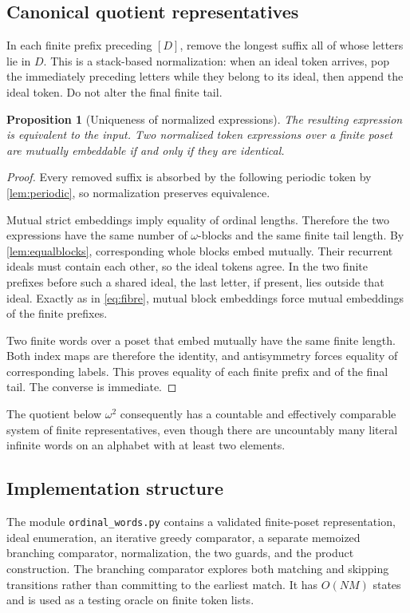 \documentclass[11pt]{article}
\numberwithin{equation}{section}
\theoremstyle{plain}
\newtheorem{proposition}[proposition]{Proposition}
\theoremstyle{definition}
\theoremstyle{remark}
\begin{document}
\subsection{Canonical quotient representatives}

In each finite prefix preceding $[D]$, remove the longest suffix all of whose letters lie in $D$. This is a stack-based normalization: when an ideal token arrives, pop the immediately preceding letters while they belong to its ideal, then append the ideal token. Do not alter the final finite tail.

\begin{proposition}[Uniqueness of normalized expressions]\label{prop:canonical}
The resulting expression is equivalent to the input. Two normalized token expressions over a finite poset are mutually embeddable if and only if they are identical.
\end{proposition}
\begin{proof}
Every removed suffix is absorbed by the following periodic token by \cref{lem:periodic}, so normalization preserves equivalence.

Mutual strict embeddings imply equality of ordinal lengths. Therefore the two expressions have the same number of $\omega$-blocks and the same finite tail length. By \cref{lem:equalblocks}, corresponding whole blocks embed mutually. Their recurrent ideals must contain each other, so the ideal tokens agree. In the two finite prefixes before such a shared ideal, the last letter, if present, lies outside that ideal. Exactly as in \eqref{eq:fibre}, mutual block embeddings force mutual embeddings of the finite prefixes.

Two finite words over a poset that embed mutually have the same finite length. Both index maps are therefore the identity, and antisymmetry forces equality of corresponding labels. This proves equality of each finite prefix and of the final tail. The converse is immediate.
\end{proof}

The quotient below $\omega^2$ consequently has a countable and effectively comparable system of finite representatives, even though there are uncountably many literal infinite words on an alphabet with at least two elements.

\subsection{Implementation structure}

The module \texttt{ordinal\_words.py} contains a validated finite-poset representation, ideal enumeration, an iterative greedy comparator, a separate memoized branching comparator, normalization, the two guards, and the product construction. The branching comparator explores both matching and skipping transitions rather than committing to the earliest match. It has $O(NM)$ states and is used as a testing oracle on finite token lists.
\end{document}
